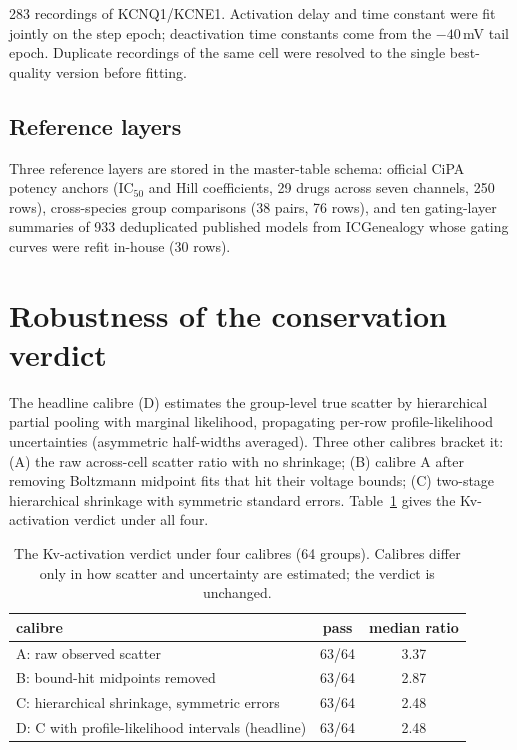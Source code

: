 \documentclass[11pt,a4paper]{article}
\begin{document}
283 recordings of KCNQ1/KCNE1. Activation delay and time constant were fit
jointly on the step epoch; deactivation time constants come from the
$-40$\,mV tail epoch. Duplicate recordings of the same cell were resolved to
the single best-quality version before fitting.

\subsection{Reference layers}

Three reference layers are stored in the master-table schema: official CiPA
potency anchors (IC$_{50}$ and Hill coefficients, 29 drugs across seven
channels, 250 rows), cross-species group comparisons (38 pairs, 76 rows), and
ten gating-layer summaries of 933 deduplicated published models from
ICGenealogy whose gating curves were refit in-house (30 rows).

\FloatBarrier
\section{Robustness of the conservation verdict}

The headline calibre (D) estimates the group-level true scatter by
hierarchical partial pooling with marginal likelihood, propagating per-row
profile-likelihood uncertainties (asymmetric half-widths averaged). Three
other calibres bracket it: (A) the raw across-cell scatter ratio with no
shrinkage; (B) calibre A after removing Boltzmann midpoint fits that hit their
voltage bounds; (C) two-stage hierarchical shrinkage with symmetric standard
errors. Table~\ref{tab:calibres} gives the Kv-activation verdict under all
four.

\begin{table}[htbp]\centering\small
\caption{The Kv-activation verdict under four calibres (64 groups). Calibres
differ only in how scatter and uncertainty are estimated; the verdict is
unchanged.}
\label{tab:calibres}
\begin{tabular}{@{}p{6.2cm}cc@{}}
\toprule
calibre & pass & median ratio \\
\midrule
A: raw observed scatter & 63/64 & 3.37 \\
B: bound-hit midpoints removed & 63/64 & 2.87 \\
C: hierarchical shrinkage, symmetric errors & 63/64 & 2.48 \\
D: C with profile-likelihood intervals (headline) & 63/64 & 2.48 \\
\bottomrule
\end{tabular}
\end{table}
\end{document}
